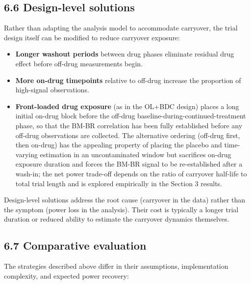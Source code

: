 \documentclass[
]{article}
\begin{document}
\subsection{6.6 Design-level solutions}

Rather than adapting the analysis model to accommodate carryover,
the trial design itself can be modified to reduce carryover
exposure:

\begin{itemize}
\item \textbf{Longer washout periods} between drug phases eliminate
  residual drug effect before off-drug measurements begin.
\item \textbf{More on-drug timepoints} relative to off-drug increase the
  proportion of high-signal observations.
\item \textbf{Front-loaded drug exposure} (as in the OL+BDC design)
  places a long initial on-drug block before the off-drug
  baseline-during-continued-treatment phase, so that the BM-BR
  correlation has been fully established before any off-drug
  observations are collected. The alternative ordering
  (off-drug first, then on-drug) has the appealing property of
  placing the placebo and time-varying estimation in an
  uncontaminated window but sacrifices on-drug exposure duration
  and forces the BM-BR signal to be re-established after a
  wash-in; the net power trade-off depends on the ratio of
  carryover half-life to total trial length and is explored
  empirically in the Section 3 results.
\end{itemize}

Design-level solutions address the root cause (carryover in the
data) rather than the symptom (power loss in the analysis). Their
cost is typically a longer trial duration or reduced ability to
estimate the carryover dynamics themselves.

\subsection{6.7 Comparative evaluation}

The strategies described above differ in their assumptions,
implementation complexity, and expected power recovery:
\end{document}
